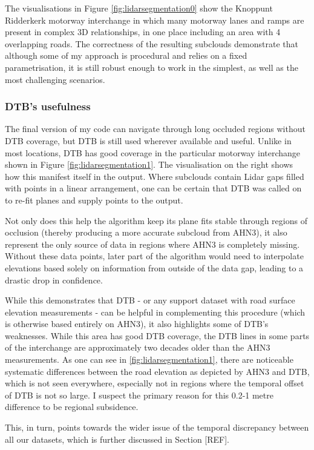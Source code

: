 The visualisations in Figure \ref{fig:lidarsegmentation0} show the Knoppunt Ridderkerk motorway interchange in which many motorway lanes and ramps are present in complex 3D relationships, in one place including an area with 4 overlapping roads. The correctness of the resulting subclouds demonstrate that although some of my approach is procedural and relies on a fixed parametrisation, it is still robust enough to work in the simplest, as well as the most challenging scenarios.

\subsubsection{DTB's usefulness}

The final version of my code can navigate through long occluded regions without DTB coverage, but DTB is still used wherever available and useful. Unlike in most locations, DTB has good coverage in the particular motorway interchange shown in Figure \ref{fig:lidarsegmentation1}. The visualisation on the right shows how this manifest itself in the output. Where subclouds contain Lidar gaps filled with points in a linear arrangement, one can be certain that DTB was called on to re-fit planes and supply points to the output.

Not only does this help the algorithm keep its plane fits stable through regions of occlusion (thereby producing a more accurate subcloud from AHN3), it also represent the only source of data in regions where AHN3 is completely missing. Without these data points, later part of the algorithm would need to interpolate elevations based solely on information from outside of the data gap, leading to a drastic drop in confidence.

While this demonstrates that DTB - or any support dataset with road surface elevation measurements - can be helpful in complementing this procedure (which is otherwise based entirely on AHN3), it also highlights some of DTB's weaknesses. While this area has good DTB coverage, the DTB lines in some parts of the interchange are approximately two decades older than the AHN3 measurements. As one can see in \ref{fig:lidarsegmentation1}, there are noticeable systematic differences between the road elevation as depicted by AHN3 and DTB, which is not seen everywhere, especially not in regions where the temporal offset of DTB is not so large. I suspect the primary reason for this 0.2-1 metre difference to be regional subsidence.

This, in turn, points towards the wider issue of the temporal discrepancy between all our datasets, which is further discussed in Section [REF].

